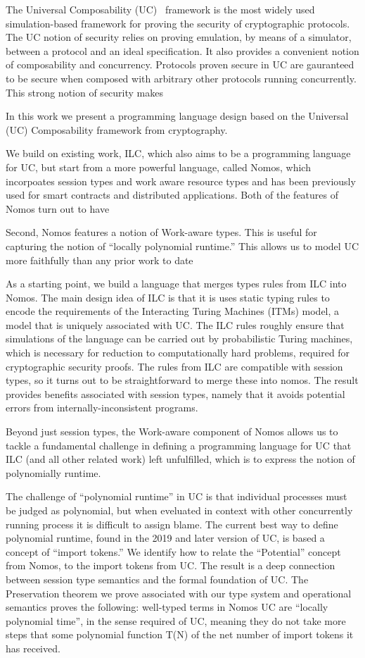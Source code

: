 The Universal Composability (UC)~\cite{uc} framework is the most widely used simulation-based framework for proving the security of cryptographic protocols. 
The UC notion of security relies on proving emulation, by means of a simulator, between a protocol and an ideal specification.
It also provides a convenient notion of composability and concurrency.
Protocols proven secure in UC are gauranteed to be secure when composed with arbitrary other protocols running concurrently. 
This strong notion of security makes 


In this work we present a programming language design based on the Universal (UC) Composability framework from cryptography.

We build on existing work, ILC, which also aims to be a programming language for UC, but start from a more powerful language, called Nomos, which incorpoates session types and work aware resource types and has been previously used for  smart contracts and distributed applications.
Both of the features of Nomos turn out to have 

Second, Nomos features a notion of Work-aware types. This is useful for capturing the notion of “locally polynomial runtime.” This allows us to model UC more faithfully than any prior work to date

As a starting point, we build a language that merges types rules from ILC into Nomos. The main design idea of ILC is that it is uses static typing rules to encode the requirements of the Interacting Turing Machines (ITMs) model, a model that is uniquely associated with UC. The ILC rules roughly ensure that simulations of the language can be carried out by probabilistic Turing machines, which is necessary for reduction to computationally hard problems, required for cryptographic security proofs. The rules from ILC are compatible with session types, so it turns out to be straightforward to merge these into nomos. The result provides benefits associated with session types, namely that it avoids potential errors from internally-inconsistent programs.

   Beyond just session types, the Work-aware component of Nomos allows us to tackle a fundamental challenge in defining a programming language for UC that ILC (and all other related work) left unfulfilled, which is to express the notion of polynomially runtime.
   
   The challenge of “polynomial runtime” in UC is that individual processes must be judged as polynomial, but when eveluated in context with other concurrently running process it is difficult to assign blame.
       The current best way to define polynomial runtime, found in the 2019 and later version of UC, is based a concept of ``import tokens.''
   We identify how to relate the “Potential” concept from Nomos, to the import tokens from UC. 
	The result is a deep connection between session type semantics and the formal foundation of UC.
	The Preservation theorem we prove associated with our type system and operational semantics proves the following: 
well-typed terms in Nomos UC are “locally polynomial time”, in the sense required of UC, meaning they do not take more steps that some polynomial function T(N) of the net number of import tokens it has received.

